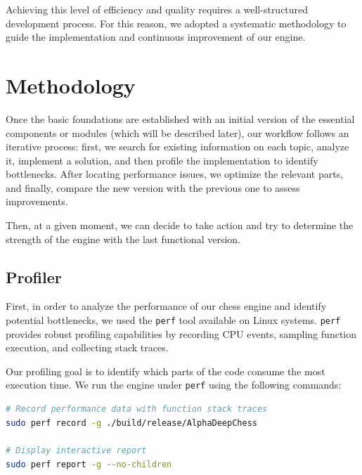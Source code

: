 \vspace{1em}

\noindent Achieving this level of efficiency and quality requires a well-structured development process. For this reason, we adopted a systematic methodology to guide the implementation and continuous improvement of our engine.

\section{Methodology}

Once the basic foundations are established with an initial version of the essential components or modules (which will be described later), our workflow follows an iterative process: first, we search for existing information on each topic, analyze it, implement a solution, and then profile the implementation to identify bottlenecks. After locating performance issues, we optimize the relevant parts, and finally, compare the new version with the previous one to assess improvements.

\vspace{1em}

\noindent Then, at a given moment, we can decide to take action and try to determine the strength of the engine with the last functional version.

\subsection*{Profiler}

First, in order to analyze the performance of our chess engine and identify potential bottlenecks, we used the \texttt{perf} tool available on Linux systems. \texttt{perf} provides robust profiling capabilities by recording CPU events, sampling function execution, and collecting stack traces.

\vspace{1em}

\noindent Our profiling goal is to identify which parts of the code consume the most execution time. We run the engine under \texttt{perf} using the following commands:

\begin{lstlisting}[language=bash, caption={Profiling AlphaDeepChess with perf}, frame=single, breaklines=true]
# Record performance data with function stack traces
sudo perf record -g ./build/release/AlphaDeepChess

# Display interactive report
sudo perf report -g --no-children
\end{lstlisting}


